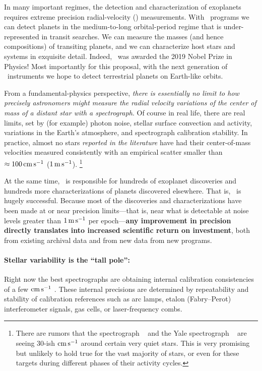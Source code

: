 \documentclass[12pt, letterpaper]{article}
\begin{document}
\sloppy\sloppypar\raggedbottom\frenchspacing

\noindent
In many important regimes, the detection and characterization of exoplanets
requires extreme precision radial-velocity (\EPRV)
measurements.
With \EPRV\ programs we can detect planets in the medium-to-long 
orbital-period regime that is under-represented in transit searches.
We can measure the 
masses (and hence compositions) of transiting planets,
and we can characterize host stars and systems in exquisite detail.
Indeed, \EPRV\ was awarded the 2019 Nobel Prize in Physics!
Most importantly for this proposal, with the next generation of \EPRV\ 
instruments we hope to detect terrestrial planets on Earth-like orbits.

From a fundamental-physics perspective, \emph{there is essentially no limit to how
precisely astronomers might measure the radial velocity variations
of the center of mass of a distant star with a spectrograph}.
Of course in real life, there are real limits, set
by (for example) photon noise, stellar surface convection and activity,
variations in the Earth's atmosphere, and spectrograph calibration stability.
In practice, almost no stars \emph{reported in the literature}
have had their center-of-mass
velocities measured consistently with an empirical scatter
smaller than $\approx 100\,{\mathrm{cm\,s^{-1}}}$ 
($1\,{\mathrm{m\,s^{-1}}}$). 
\footnote{There are rumors that the  spectrograph
  \ESPRESSO\ \citep{Pepe2010} and the Yale spectrograph \EXPRES\ 
  \citep{Jurgenson2016} are seeing 
  30-ish ${\mathrm{cm\,s^{-1}}}$ around certain very quiet stars.
This is very promising but unlikely to hold true for the vast majority of stars, or even for these targets during different phases of their activity cycles.}

At the same time, \EPRV\ is responsible for hundreds of  exoplanet discoveries and hundreds more \foreign{a
posteriori} characterizations of planets discovered elsewhere.
That is, \EPRV\ is hugely successful.
Because most of the discoveries and characterizations have been made
at or near precision limits---that is, near what is detectable at noise levels
greater than $1\,{\mathrm{m\,s^{-1}}}$ per epoch---\textbf{any improvement in precision directly
translates into increased scientific return on investment},
both from existing archival data and from new data from new programs.

\paragraph{Stellar variability is the ``tall pole'':}
Right now the best spectrographs are obtaining internal calibration
consistencies of a few ${\mathrm{cm\,s^{-1}}}$ \citep{espresso-eprv4, expres-eprv4}.
These internal precisions are determined by repeatability and
stability of calibration references such as arc lamps, etalon
(Fabry--Perot) interferometer signals, gas cells, or laser-frequency
combs.
\end{document}
